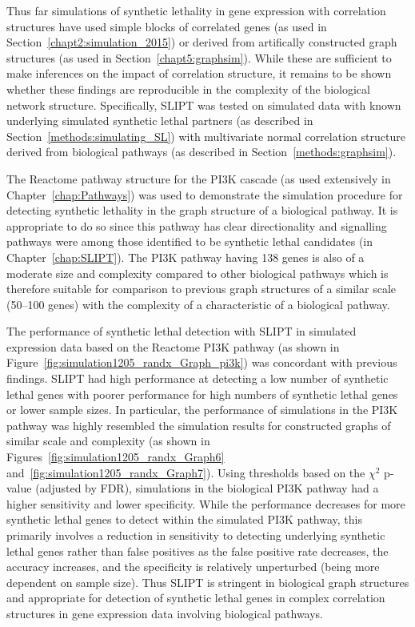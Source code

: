 \FloatBarrier

Thus far simulations of synthetic lethality in gene expression with correlation structures have used simple blocks of correlated genes (as used in Section~\ref{chapt2:simulation_2015}) or derived from artifically constructed graph structures (as used in Section~\ref{chapt5:graphsim}). While these are sufficient to make inferences on the impact of correlation structure, it remains to be shown whether these findings are reproducible in the complexity of the biological network structure. Specifically, \gls{SLIPT} was tested on simulated data with known underlying simulated synthetic lethal partners (as described in Section~\ref{methods:simulating_SL}) with multivariate normal correlation structure derived from biological pathways (as described in Section~\ref{methods:graphsim}).

The Reactome pathway structure for the \gls{PI3K} cascade (as used extensively in Chapter~\ref{chap:Pathways}) was used to demonstrate the simulation procedure for detecting synthetic lethality in the graph structure of a biological pathway. It is appropriate to do so since this pathway has clear directionality and signalling pathways were among those identified to be synthetic lethal candidates (in Chapter~\ref{chap:SLIPT}). The \gls{PI3K} pathway having 138 genes is also of a moderate size and complexity compared to other biological pathways which is therefore suitable for comparison to previous graph structures of a similar scale (50--100 genes) with the complexity of a characteristic of a biological pathway.

The performance of synthetic lethal detection with \gls{SLIPT} in simulated expression data based on the Reactome \gls{PI3K} pathway (as shown in Figure~\ref{fig:simulation1205_randx_Graph_pi3k}) was concordant with previous findings. \gls{SLIPT} had high performance at detecting a low number of synthetic lethal genes with poorer performance for high numbers of synthetic lethal genes or lower sample sizes. In particular, the performance of simulations in the \gls{PI3K} pathway was highly resembled the simulation results for constructed graphs of similar scale and complexity (as shown in Figures~\ref{fig:simulation1205_randx_Graph6} and~\ref{fig:simulation1205_randx_Graph7}). Using thresholds based on the $\chi^2$ p-value (adjusted by FDR), simulations in the biological \gls{PI3K} pathway had a higher sensitivity and lower specificity. While the performance decreases for more synthetic lethal genes to detect within the simulated \gls{PI3K} pathway, this primarily involves a reduction in sensitivity to detecting underlying synthetic lethal genes rather than false positives as the false positive rate decreases, the accuracy increases, and the specificity is relatively unperturbed (being more dependent on sample size). Thus \gls{SLIPT} is stringent in biological graph structures and appropriate for detection of synthetic lethal genes in complex correlation structures in gene expression data involving biological pathways. 

